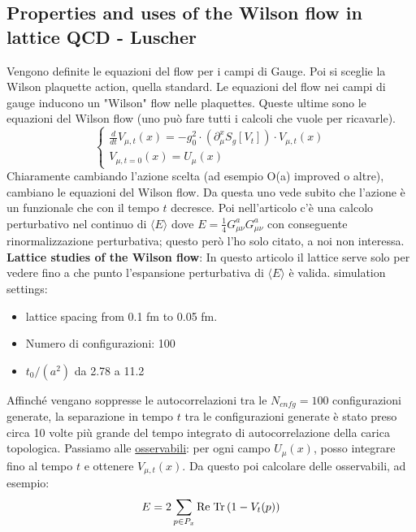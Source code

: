 \documentclass[12pt,a4paper,openright]{article}
\newcommand{\la}{\langle}
\newcommand{\ra}{\rangle}
\newcommand{\spc}{\hspace*{1mm}}
\begin{document}
\subsection{Properties and uses of the Wilson flow in lattice QCD - Luscher}
Vengono definite le equazioni del flow per i campi di Gauge.
Poi si sceglie la Wilson plaquette action, quella standard. Le equazioni del flow nei campi di gauge inducono un "Wilson" flow nelle plaquettes.
Queste ultime sono le equazioni del Wilson flow (uno può fare tutti i calcoli che vuole per ricavarle).
\begin{equation*}
  \begin{cases}
    \frac{d}{dt}V_{\mu,t}(x) = - g_0^2 \cdot \left(\partial_{\mu}^x S_g [V_t]\right) \cdot V_{\mu,t}(x)
    \\
    V_{\mu, t =0} (x)= U_\mu (x)
  \end{cases}
\end{equation*}
Chiaramente cambiando l'azione scelta (ad esempio O(a) improved o altre), cambiano le equazioni del Wilson flow.
Da questa uno vede subito che l'azione è un funzionale che con il tempo $t$ decresce.
\newline
Poi nell'articolo c'è una calcolo perturbativo nel continuo di $\la E \ra$ dove $E = \frac{1}{4}G_{\mu\nu}^aG_{\mu\nu}^a$ con conseguente rinormalizzazione perturbativa;
questo però l'ho solo citato, a noi non interessa.
\newline
\newline
{\bf Lattice studies of the Wilson flow}: \newline
In questo articolo il lattice serve solo per vedere fino a che punto l'espansione perturbativa di $\la E \ra$ è valida.
simulation settings:
\begin{itemize}
  \item lattice spacing from 0.1 fm to 0.05 fm.
  \item Numero di configurazioni: 100
  \item $t_0/(a^2)$ da 2.78 a 11.2
\end{itemize}
Affinché vengano soppresse le autocorrelazioni tra le $N_{cnfg} = 100$ configurazioni generate, la separazione in tempo $t$ tra le configurazioni generate è stato preso circa 10 volte più grande del tempo integrato di autocorrelazione della carica topologica.
\newline
Passiamo alle \underline{osservabili}: per ogni campo $U_\mu(x)$, posso integrare fino al tempo $t$ e ottenere $V_{\mu,t}(x)$.
Da questo poi calcolare delle osservabili, ad esempio:
\begin{equation*}
  E = 2\sum_{p \in P_x} \text{Re} \spc \text{Tr} \left( 1 - V_{t}(p)\right)
\end{equation*}
\end{document}
